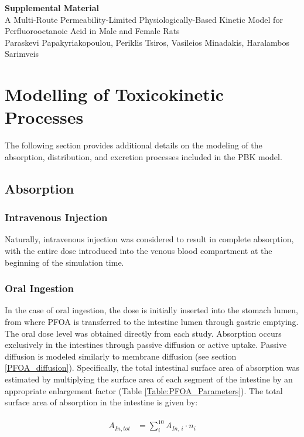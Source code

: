 \documentclass[preprint,12pt,authoryear]{elsarticle}
\begin{document}
\begin{center}
\Large \textbf{Supplemental Material} \\[10pt]
\large A Multi-Route Permeability-Limited Physiologically-Based Kinetic Model for Perfluorooctanoic Acid in Male and Female Rats \\[20pt]
\normalsize
Paraskevi Papakyriakopoulou, Periklis Tsiros, Vasileios Minadakis, Haralambos Sarimveis
\end{center}

\newpage  
\tableofcontents
\newpage  



\newpage
 \section{Modelling of Toxicokinetic Processes}
 The following section provides additional details on the modeling of the absorption, distribution, and excretion processes included in the PBK model.
 
 \subsection{Absorption}
\subsubsection{Intravenous Injection} 
Naturally, intravenous injection was considered to result in complete absorption, with the entire dose introduced into the venous blood compartment at the beginning of the simulation time.

\subsubsection{Oral Ingestion} 
In the case of oral ingestion, the dose is initially inserted into the stomach lumen, from where PFOA is transferred to the intestine lumen through gastric emptying. The oral dose level was obtained directly from each study. Absorption occurs exclusively in the intestines through passive diffusion or active uptake. Passive diffusion is modeled similarly to membrane diffusion (see section \ref{PFOA_diffusion}). Specifically, the total intestinal surface area of absorption was estimated by multiplying the surface area of each segment of the intestine by an appropriate enlargement factor (Table \ref{Table:PFOA_Parameters}). The total surface area of absorption in the intestine is given by:

\begin{align}
\begin{aligned}
A_{In,tot} &= \sum_i^{10} A_{In, \, i} \cdot n_i\\
\end{aligned} 
\end{align}
\end{document}
